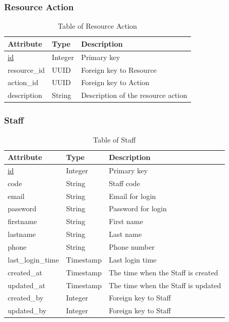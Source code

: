 \subsubsection{Resource Action}
\begin{table}[H]
    \centering
    \begin{tabular}{|p{3cm}|p{2cm}|p{\dimexpr\textwidth-6.8cm}|} %
        \hline
        \rowcolor[HTML]{C0C0C0} 
        \textbf{Attribute} & \textbf{Type} & \textbf{Description} \\ \hline
        \underline{id} & Integer & Primary key \\ \hline
        resource\_id & UUID & Foreign key to Resource \\ \hline
        action\_id & UUID & Foreign key to Action \\ \hline
        description & String & Description of the resource action \\ \hline
    \end{tabular}
    \caption{Table of Resource Action}
    \label{tab:resource-action-table}
\end{table}

\subsubsection{Staff}
\begin{table}[H]
    \centering
    \begin{tabular}{|p{3cm}|p{2cm}|p{\dimexpr\textwidth-6.8cm}|} %
        \hline
        \rowcolor[HTML]{C0C0C0} 
        \textbf{Attribute} & \textbf{Type} & \textbf{Description} \\ \hline
        \underline{id} & Integer & Primary key \\ \hline
        code & String & Staff code \\ \hline
        email & String & Email for login \\ \hline
        password & String & Password for login \\ \hline
        firstname & String & First name \\ \hline
        lastname & String & Last name \\ \hline
        phone & String & Phone number \\ \hline
        last\_login\_time & Timestamp & Last login time \\ \hline
        created\_at & Timestamp & The time when the Staff is created \\ \hline
        updated\_at & Timestamp & The time when the Staff is updated \\ \hline
        created\_by & Integer & Foreign key to Staff \\ \hline
        updated\_by & Integer & Foreign key to Staff \\ \hline
    \end{tabular}
    \caption{Table of Staff}
    \label{tab:staff-table}
\end{table}

